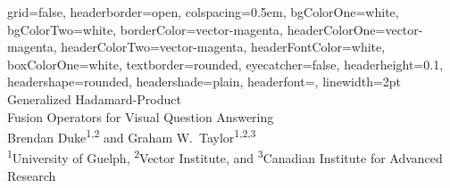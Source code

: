 \documentclass[a0paper,portrait]{baposter}
\begin{document}
\begin{poster}
{
grid=false,
headerborder=open, %
colspacing=0.5em, %
bgColorOne=white, %
bgColorTwo=white, %
borderColor=vector-magenta, %
headerColorOne=vector-magenta, %
headerColorTwo=vector-magenta, %
headerFontColor=white, %
boxColorOne=white, %
textborder=rounded, %
eyecatcher=false, %
headerheight=0.1\textheight, %
headershape=rounded, %
headershade=plain,
headerfont=\Large\textsf, %
linewidth=2pt %
}
{}
%
%
{
\textsf %
{Generalized Hadamard-Product\\
Fusion Operators for Visual Question Answering}
} %
{\sf\vspace{0em}\\
Brendan Duke\textsuperscript{1,2} and
Graham W.~Taylor\textsuperscript{1,2,3}
\vspace{0.1em}\\
\small{
\textsuperscript{1}University of Guelph,
\textsuperscript{2}Vector Institute, and 
\textsuperscript{3}Canadian Institute for Advanced Research
\vspace{0.2em}\\
}}
\end{poster}
\end{document}
